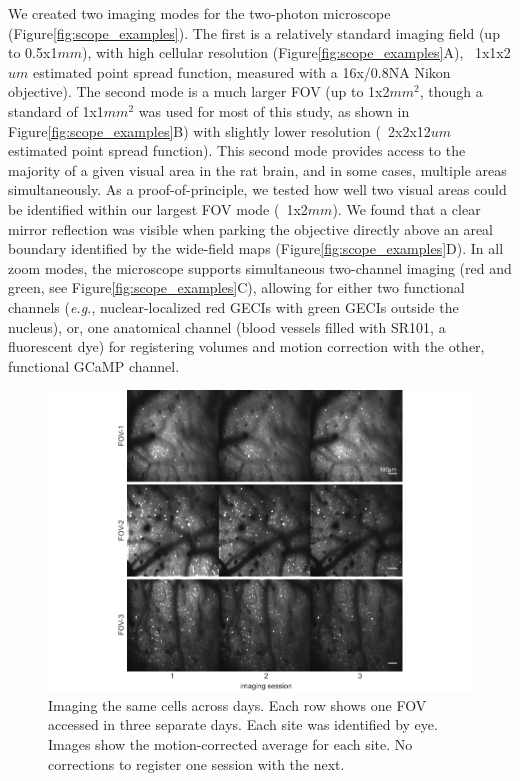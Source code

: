 We created two imaging modes for the two-photon microscope (Figure\ref{fig:scope_examples}). The first is a relatively standard imaging field (up to 0.5x1$mm$), with high cellular resolution (Figure\ref{fig:scope_examples}A), ~1x1x2$um$ estimated point spread function, measured with a 16x/0.8NA Nikon objective). The second mode is a much larger FOV (up to 1x2$mm^2$, though a standard of 1x1$mm^2$ was used for most of this study, as shown in Figure\ref{fig:scope_examples}B) with slightly lower resolution (~2x2x12$um$ estimated point spread function). This second mode provides access to the majority of a given visual area in the rat brain, and in some cases, multiple areas simultaneously. As a proof-of-principle, we tested how well two visual areas could be identified within our largest FOV mode (~1x2$mm$). We found that a clear mirror reflection was visible when parking the objective directly above an areal boundary identified by the wide-field maps (Figure\ref{fig:scope_examples}D). In all zoom modes, the microscope supports simultaneous two-channel imaging (red and green, see Figure\ref{fig:scope_examples}C), allowing for either two functional channels (\textit{e.g.}, nuclear-localized red GECIs with green GECIs outside the nucleus), or, one anatomical channel (blood vessels filled with SR101, a fluorescent dye) for registering volumes and motion correction with the other, functional GCaMP channel. 

\begin{figure}[t!]
    \includegraphics[width=\textwidth]{figures/chapter_2/fig_2-8_multiday_imaging/fig_2-8_multiday_imaging.pdf}
    \vspace{.1in}
    \caption[Multi-day imaging]{Imaging the same cells across days. Each row shows one FOV accessed in three separate days. Each site was identified by eye. Images show the motion-corrected average for each site. No corrections to register one session with the next.    
    \label{fig:multiday_imaging}}
\end{figure}

